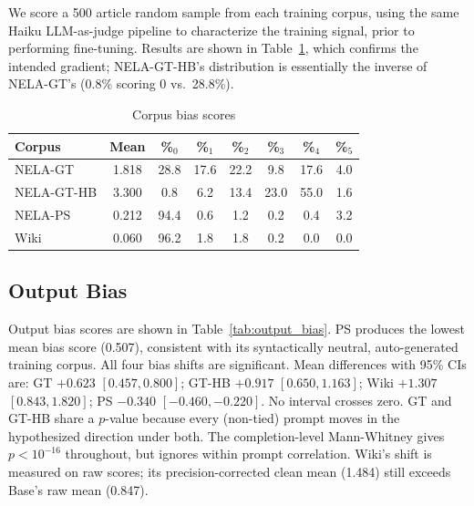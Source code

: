 \documentclass[11pt]{article}
\begin{document}
We score a 500 article random sample from each training corpus, using the same Haiku LLM-as-judge pipeline to characterize the training signal, prior to performing fine-tuning. 
Results are shown in Table~\ref{tab:corpus_bias}, which confirms the intended gradient; NELA-GT-HB's distribution is essentially the inverse of NELA-GT's (0.8\% scoring 0 vs.\ 28.8\%).

\begin{table}[htbp]
  \centering
  \footnotesize
  \setlength{\tabcolsep}{3pt}
  \begin{tabular}{lccccccc}
    \toprule
    Corpus & Mean & \%$_{0}$ & \%$_{1}$ & \%$_{2}$ & \%$_{3}$ & \%$_{4}$ & \%$_{5}$ \\
    \midrule
    NELA-GT     & 1.818 & 28.8 & 17.6 & 22.2 &  9.8 & 17.6 & 4.0 \\
    NELA-GT-HB  & 3.300 &  0.8 &  6.2 & 13.4 & 23.0 & 55.0 & 1.6 \\
    NELA-PS     & 0.212 & 94.4 &  0.6 &  1.2 &  0.2 &  0.4 & 3.2 \\
    Wiki        & 0.060 & 96.2 &  1.8 &  1.8 &  0.2 &  0.0 & 0.0 \\
    \bottomrule
  \end{tabular}
  \caption{Corpus bias scores}
  \label{tab:corpus_bias}
\end{table}


\subsection{Output Bias}

Output bias scores are shown in Table~\ref{tab:output_bias}. %
PS produces the lowest mean bias score (0.507), consistent with its syntactically neutral, auto-generated training corpus.
All four bias shifts are significant.
Mean differences with 95\% CIs are: GT $+0.623$ $[0.457, 0.800]$; GT-HB $+0.917$ $[0.650, 1.163]$; Wiki $+1.307$ $[0.843, 1.820]$; PS $-0.340$ $[-0.460, -0.220]$.
No interval crosses zero.
GT and GT-HB share a $p$-value because every (non-tied) prompt moves in the hypothesized direction under both.
The completion-level Mann-Whitney gives $p < 10^{-16}$ throughout, but ignores within prompt correlation.
Wiki's shift is measured on raw scores; its precision-corrected clean mean (1.484) still exceeds Base's raw mean (0.847).
\end{document}
